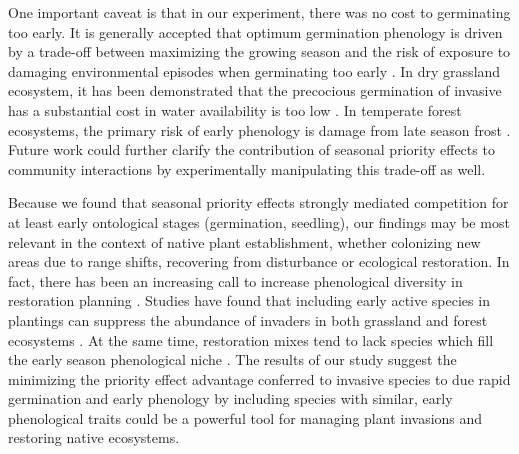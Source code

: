 \documentclass{article}\usepackage[]{graphicx}\usepackage[]{color}
\begin{document}
One important caveat is that in our experiment, there was no cost to germinating too early. It is generally accepted that optimum germination phenology is driven by a trade-off between maximizing the growing season and the risk of exposure to damaging environmental episodes when germinating too early \citep{}. In dry grassland ecosystem, it has been demonstrated that the precocious germination of invasive has a substantial cost in water availability is too low \citep{Wainwright_2011}. In temperate forest ecosystems, the primary risk of early phenology is damage from late season frost \citep{}. Future work could further clarify the contribution of seasonal priority effects to community interactions by experimentally manipulating this trade-off as well.

Because we found that seasonal priority effects strongly mediated competition for at least early ontological stages (germination, seedling), our findings may be most relevant in the context of native plant establishment, whether colonizing new areas due to range shifts, recovering from disturbance or ecological restoration. In fact, there has been an increasing call to increase phenological diversity in restoration planning \citep{Hess:2019vn}. Studies have found that including early active species in plantings can suppress the abundance of invaders in both grassland \citep{Cleland:2013wo} and forest ecosystems \citep{Schuster:2020ww}. At the same time, restoration mixes tend to lack species which fill the early season phenological niche \citep{Havens:2016vo}. The results of our study suggest the minimizing the priority effect advantage conferred to invasive species to due rapid germination and early phenology by including species with similar, early phenological traits could be a powerful tool for managing plant invasions and restoring native ecosystems.
\end{document}
